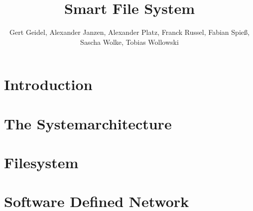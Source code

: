 \documentclass[journal]{IEEEtran}
\begin{document}
\title{Smart File System}



\author{Gert Geidel, Alexander Janzen, Alexander Platz, Franck Russel, Fabian Spie\ss, Sascha Wolke, Tobias Wollowski}


\maketitle





\begin{abstract}




\end{abstract}



\IEEEpeerreviewmaketitle







\section{Introduction}



\section{The Systemarchitecture}







\section{Filesystem}





\section{Software Defined Network}


\end{document}
